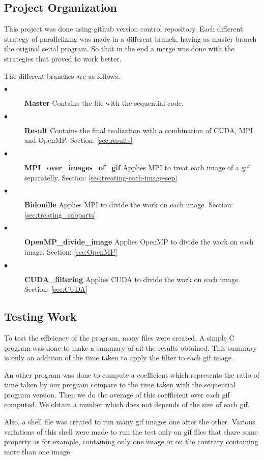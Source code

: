 \documentclass[conference,compsoc]{IEEEtran}
\begin{document}
\subsection{Project Organization} \label{sec:project-organization}
This project was done using github version control repository. Each different strategy of parallelizing was made in a different branch, having as master branch the original serial program. So that in the end a merge was done with the strategies that proved to work better.

The different branches are as follows:
\begin{description}
	\item[$\bullet$] \textbf{Master} Contains the file with the sequential code.
	\item[$\bullet$] \textbf{Result} Contains the final realization with a combination of CUDA, MPI and OpenMP. Section: \ref{sec:results}
	\item[$\bullet$] \textbf{MPI\_over\_images\_of\_gif} Applies MPI to treat each image of a gif separatelly. Section: \ref{sec:treating-each-image-sep}
	\item[$\bullet$] \textbf{Bidouille} Applies MPI to divide the work on each image. Section: \ref{sec:treating_subparts}
	\item[$\bullet$] \textbf{OpenMP\_divide\_image} Applies OpenMP to divide the work on each image. Section: \ref{sec:OpenMP}
	\item[$\bullet$] \textbf{CUDA\_filtering} Applies CUDA to divide the work on each image. Section: \ref{sec:CUDA}
\end{description}


\subsection{Testing Work}
To test the efficiency of the program, many files were created. A simple C program was done to make a summary of all the results obtained. This summary is only an addition of the time taken to apply the filter to each gif image.

An other program was done to compute a coefficient which represents the ratio of time taken by our program compare to the time taken with the sequential program version. Then we do the average of this coefficient over each gif computed. We obtain a number which does not depends of the size of each gif.

Also, a shell file was created to run many gif images one after the other. Various variations of this shell were made to run the test only on gif files that share some property as for example, containing only one image or on the contrary containing more than one image.
\end{document}
